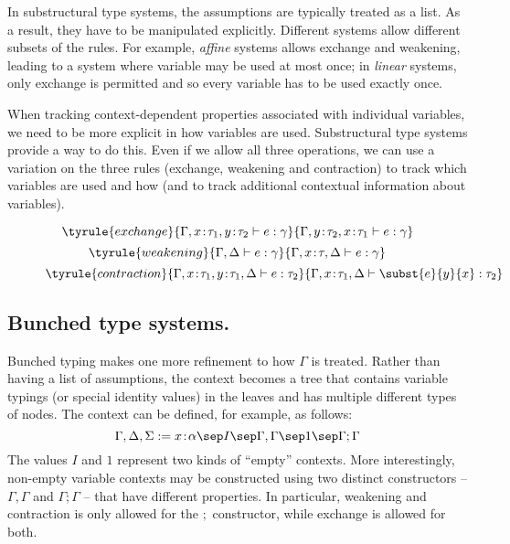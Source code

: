 In substructural type systems, the assumptions are typically treated as a list. As a result,
they have to be manipulated explicitly. Different systems allow different subsets of the rules.
For example, \emph{affine} systems allows exchange and weakening, leading to a system where
variable may be used at most once; in \emph{linear} systems, only exchange is permitted and so
every variable has to be used exactly once.

When tracking context-dependent properties associated with individual variables, we need to
be more explicit in how variables are used. Substructural type systems provide a way to do this.
Even if we allow all three operations, we can use a variation on the three rules (exchange,
weakening and contraction) to track which variables are used and how (and to track additional
contextual information about variables).

\begin{figure}
\begin{equation*}
\tyrule{exchange}
  {\Gamma, x\!:\!\tau_1, y\!:\!\tau_2 \vdash e : \gamma}
  {\Gamma, y\!:\!\tau_2, x\!:\!\tau_1 \vdash e : \gamma}
\end{equation*}
\begin{equation*}
\tyrule{weakening}
  {\Gamma, \Delta \vdash e : \gamma}
  {\Gamma, x\!:\!\tau, \Delta \vdash e : \gamma}
\end{equation*}
\begin{equation*}
\tyrule{contraction}
  {\Gamma, x\!:\!\tau_1, y\!:\!\tau_1, \Delta \vdash e : \tau_2}
  {\Gamma, x\!:\!\tau_1, \Delta \vdash \subst{e}{y}{x} : \tau_2}
\end{equation*}

\label{fig:substructural-rules}
\end{figure}


\subsection{Bunched type systems.}
Bunched typing makes one more refinement to how $\Gamma$ is treated. Rather than having a list
of assumptions, the context becomes a tree that contains variable typings (or special identity
values) in the leaves and has multiple different types of nodes. The context can be defined,
for example, as follows:
%
\begin{equation*}
\Gamma, \Delta, \Sigma := x\!:\!\alpha \sep I \sep \Gamma, \Gamma \sep 1 \sep \Gamma; \Gamma
\end{equation*}
%
The values $I$ and $1$ represent two kinds of ``empty'' contexts. More interestingly, non-empty
variable contexts may be constructed using two distinct constructors -- $\Gamma, \Gamma$ and
$\Gamma; \Gamma$ -- that have different properties. In particular, weakening and contraction is
only allowed for the $;$ constructor, while exchange is allowed for both.

